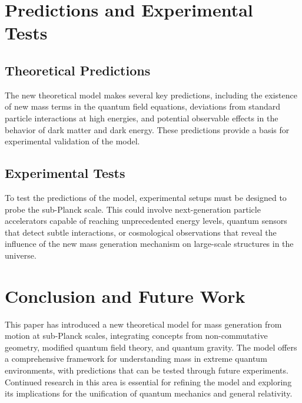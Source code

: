 \documentclass{article}
\begin{document}
\section{Predictions and Experimental Tests}

\subsection{Theoretical Predictions}
The new theoretical model makes several key predictions, including the existence of new mass terms in the quantum field equations, deviations from standard particle interactions at high energies, and potential observable effects in the behavior of dark matter and dark energy. These predictions provide a basis for experimental validation of the model.

\subsection{Experimental Tests}
To test the predictions of the model, experimental setups must be designed to probe the sub-Planck scale. This could involve next-generation particle accelerators capable of reaching unprecedented energy levels, quantum sensors that detect subtle interactions, or cosmological observations that reveal the influence of the new mass generation mechanism on large-scale structures in the universe.

\section{Conclusion and Future Work}
This paper has introduced a new theoretical model for mass generation from motion at sub-Planck scales, integrating concepts from non-commutative geometry, modified quantum field theory, and quantum gravity. The model offers a comprehensive framework for understanding mass in extreme quantum environments, with predictions that can be tested through future experiments. Continued research in this area is essential for refining the model and exploring its implications for the unification of quantum mechanics and general relativity.
\end{document}
